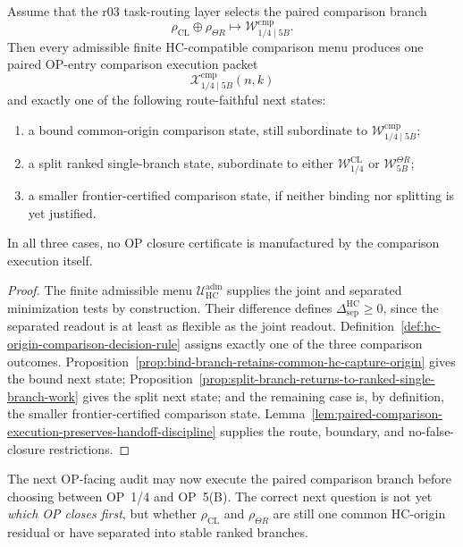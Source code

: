 \begin{theorem}
\label{thm:first-paired-op-entry-comparison-execution-theorem}
Assume that the r03 task-routing layer selects the paired comparison branch
\[
  \rho_{\mathrm{CL}}\oplus\rho_{\Theta R}
  \longmapsto
  \mathcal W_{1/4\mid 5B}^{\mathrm{cmp}}.
\]
Then every admissible finite HC-compatible comparison menu produces one paired OP-entry comparison execution packet
\[
  \mathcal X_{1/4\mid 5B}^{\mathrm{cmp}}(n,k)
\]
and exactly one of the following route-faithful next states:
\begin{enumerate}[leftmargin=2em,label=(\roman*)]
  \item a bound common-origin comparison state, still subordinate to $\mathcal W_{1/4\mid 5B}^{\mathrm{cmp}}$;
  \item a split ranked single-branch state, subordinate to either $\mathcal W_{1/4}^{\mathrm{CL}}$ or $\mathcal W_{5B}^{\Theta R}$;
  \item a smaller frontier-certified comparison state, if neither binding nor splitting is yet justified.
\end{enumerate}
In all three cases, no OP closure certificate is manufactured by the comparison execution itself.
\end{theorem}

\begin{proof}
The finite admissible menu $\mathcal U_{\mathrm{HC}}^{\mathrm{adm}}$ supplies the joint and separated minimization tests by construction.  Their difference defines $\Delta_{\mathrm{sep}}^{\mathrm{HC}}\geq0$, since the separated readout is at least as flexible as the joint readout.  Definition~\ref{def:hc-origin-comparison-decision-rule} assigns exactly one of the three comparison outcomes.  Proposition~\ref{prop:bind-branch-retains-common-hc-capture-origin} gives the bound next state; Proposition~\ref{prop:split-branch-returns-to-ranked-single-branch-work} gives the split next state; and the remaining case is, by definition, the smaller frontier-certified comparison state.  Lemma~\ref{lem:paired-comparison-execution-preserves-handoff-discipline} supplies the route, boundary, and no-false-closure restrictions.
\end{proof}

\begin{corollary}
\label{cor:v3340-r04-working-rule}
The next OP-facing audit may now execute the paired comparison branch before choosing between OP~1/4 and OP~5(B).  The correct next question is not yet \emph{which OP closes first}, but whether $\rho_{\mathrm{CL}}$ and $\rho_{\Theta R}$ are still one common HC-origin residual or have separated into stable ranked branches.
\end{corollary}

